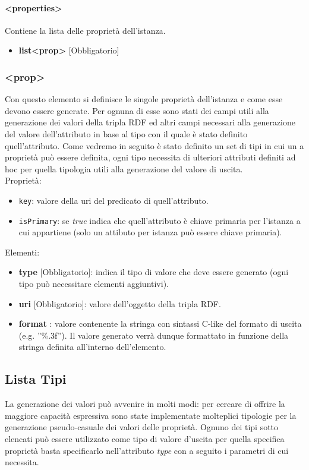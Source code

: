 \documentclass[12pt,a4paper,italian]{article}
\begin{document}
\paragraph{<properties>}
Contiene la lista delle proprietà dell'istanza.
\begin{itemize}
	\item \textbf{list<prop>} [Obbligatorio]
\end{itemize}

\subsubsection{<prop>}
Con questo elemento si definisce le singole proprietà dell'istanza e come esse devono essere generate. Per ognuna di esse sono stati dei campi utili alla generazione dei valori della tripla RDF 
ed altri campi necessari alla generazione del valore dell'attributo in base al tipo con il quale è stato definito quell'attributo. Come vedremo in seguito è stato definito un set di tipi in cui un a proprietà può essere
definita, ogni tipo necessita di ulteriori attributi definiti ad hoc per quella tipologia utili alla generazione del valore di uscita.\\
Proprietà:
\begin{itemize}
\item \texttt{key}: valore della uri del predicato di quell'attributo.
\item \texttt{isPrimary}: se \emph{true} indica che quell'attributo è chiave primaria per l'istanza a cui appartiene (solo un attibuto per istanza può essere chiave primaria).
\end{itemize}
Elementi:
\begin{itemize}
\item \textbf{type} [Obbligatorio]: indica il tipo di valore che deve essere generato (ogni tipo può necessitare elementi aggiuntivi).
\item \textbf{uri} [Obbligatorio]: valore dell'oggetto della tripla RDF.
\item \textbf{format} : valore contenente la stringa con sintassi C-like del formato di uscita (e.g. ''\%.3f''). Il valore generato verrà dunque formattato in funzione della stringa definita all'interno dell'elemento.
\end{itemize}

\subsection{Lista Tipi}
La generazione dei valori può avvenire in molti modi: per cercare di offrire la maggiore capacità espressiva sono state implementate molteplici tipologie 
per la generazione pseudo-casuale dei valori delle proprietà.
Ognuno dei tipi sotto elencati può essere utilizzato come tipo di valore d'uscita per quella specifica proprietà basta specificarlo 
nell'attributo \emph{type} con a seguito i parametri di cui necessita.\\
\end{document}

